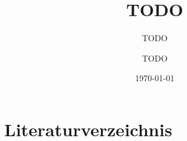 \documentclass[paper=a4,fontsize=12pt,parskip=half]{scrartcl}
\title{TODO}
\subtitle{TODO}
\author{TODO}
\date{\today{}}
\begin{document}


\cleardoublepage



\cleardoublepage

\tableofcontents{}

\cleardoublepage


\cleardoublepage


\cleardoublepage


\cleardoublepage


\cleardoublepage


\cleardoublepage


\appendix{}

\cleardoublepage


\cleardoublepage

\section{Literaturverzeichnis}
\end{document}
